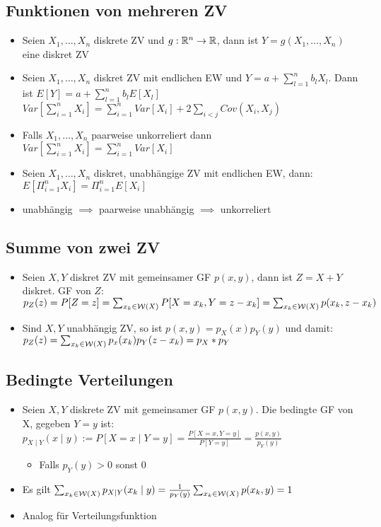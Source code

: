 \subsection{Funktionen von mehreren ZV}
\begin{itemize}
    \item Seien $X_1, \dots, X_n$ diskrete ZV und $g: \mathbb{R}^n \to \mathbb{R}$, dann ist $Y = g(X_1, \dots, X_n)$ eine diskret ZV
    \item Seien $X_1, \dots, X_n$ diskret ZV mit endlichen EW und $Y = a + \sum_{l=1}^{n} b_l X_l$. Dann ist $E[Y] = a + \sum_{l=1}^{n} b_l E[X_l]$
    \\ $Var [\sum_{i=1}^{n} X_i] = \sum_{i=1}^{n} Var[X_i] + 2 \sum_{i<j} Cov(X_i, X_j)$
    \item Falls $X_1, \dots, X_n$ paarweise unkorreliert dann $Var[\sum_{i=1}^{n} X_i] = \sum_{i=1}^{n} Var[X_i]$
    \item Seien $X_1, \dots, X_n$ diskret, unabhängige ZV mit endlichen EW, dann: $E[\Pi_{i=1}^{n} X_i] = \Pi_{i=1}^{n} E[X_i]$
    \item unabhängig $\implies$ paarweise unabhängig $\implies$ unkorreliert
\end{itemize}

\subsection{Summe von zwei ZV}
\begin{itemize}
    \item Seien $X, Y$ diskret ZV mit gemeinsamer GF $p(x, y)$, dann ist $Z = X + Y$ diskret. GF von $Z$: $p_Z(z) = P[Z = z] = \sum_{x_k \in \mathcal{W}(X)} P[X = x_k, Y = z - x_k] = \sum_{x_k \in \mathcal{W}(X)} p(x_k, z - x_k)$
    \item Sind $X, Y$ unabhängig ZV, so ist $p(x, y) = p_X(x) p_Y(y)$ und damit: $p_Z(z) = \sum_{x_k \in \mathcal{W}(X)} p_x(x_k) p_Y(z - x_k) = p_X * p_Y$
\end{itemize}

\subsection{Bedingte Verteilungen}
\begin{itemize}
    \item Seien $X, Y$ diskrete ZV mit gemeinsamer GF $p(x, y)$. Die bedingte GF von X, gegeben $Y = y$ ist:\\ $p_{X \mid Y} (x \mid y) := P[X = x \mid Y = y] = \frac{P[X = x, Y = y]}{P[Y = y]} = \frac{p(x,y)}{p_Y(y)}$
        \begin{itemize}
            \item Falls $p_Y(y) > 0$ sonst $0$
        \end{itemize}
    \item Es gilt $\sum_{x_k \in \mathcal{W}(X)} p_{X \mid Y} (x_k \mid y) = \frac{1}{p_Y(y)} \sum_{x_k \in \mathcal{W}(X)} p(x_k, y) = 1$
    \item Analog für Verteilungsfunktion
\end{itemize}

